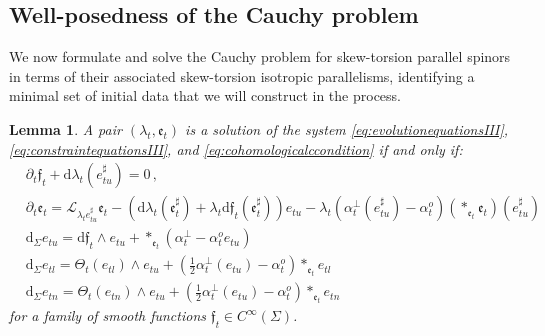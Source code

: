 \documentclass[10pt,reqno,a4paper]{amsart}
\theoremstyle{plain}
\newtheorem{lemma}[thm]{Lemma}
\theoremstyle{definition}
\theoremstyle{remark}
\theoremstyle{remark}
\def\dd{\mathrm{d}}
\def\fre{\mathfrak{e}}
\renewcommand{\(}{ (}
\renewcommand{\)}{ )}
\newcommand{\frf}{\mathfrak{f}}
\begin{document}
%

\subsection{Well-posedness of the Cauchy problem}
\label{sec:skewtorsionwellposedness}

%

We now formulate and solve the Cauchy problem for skew-torsion parallel spinors in terms of their associated skew-torsion isotropic parallelisms, identifying a minimal set of initial data that we will construct in the process. 

\begin{lemma}
\label{lemma:refor1}
 A pair $(\lambda_t,\fre_t)$ is a solution of the system \eqref{eq:evolutionequationsIII}, \eqref{eq:constraintequationsIII}, and \eqref{eq:cohomologicalccondition} if and only if:
 \begin{eqnarray}
 & \partial_t \frf_t + \dd\lambda_t(e_{tu}^{\sharp}) = 0\, , \nonumber \\  
 & \partial_t \fre_t= \mathcal{L}_{\lambda_t e^{\sharp}_{tu}} \fre_t - (\dd\lambda_t(\fre_t^{\sharp}) + \lambda_t \dd\frf_t(\fre_t^{\sharp}) ) e_{tu} - \lambda_t (\alpha^{\perp}_t (e^{\sharp}_{tu}) - \alpha^o_t) ( \ast_{\fre_t} \fre_t)(e^{\sharp}_{tu} ) \nonumber  \\   
& \dd_{\Sigma} e_{tu} = \dd\frf_t \wedge e_{tu} + \ast_{\fre_t} (\alpha^{\perp}_t   - \alpha^o_t e_{tu})   \label{eq:evolutionconstraintskew} \\
& \dd_{\Sigma} e_{tl} = \Theta_t(e_{tl})\wedge e_{tu} +  (\frac{1}{2} \alpha^{\perp}_t (e_{tu}) - \alpha^o_t) \ast_{\fre_t} e_{tl} \nonumber \\
& \dd_{\Sigma} e_{tn} = \Theta_t(e_{tn})\wedge e_{tu} +  (\frac{1}{2} \alpha^{\perp}_t (e_{tu}) - \alpha^o_t) \ast_{\fre_t} e_{tn} \nonumber  
 \end{eqnarray}
 for a family of smooth functions $\frf_t\in C^{\infty}(\Sigma)$.
\end{lemma}
    
\end{document}
